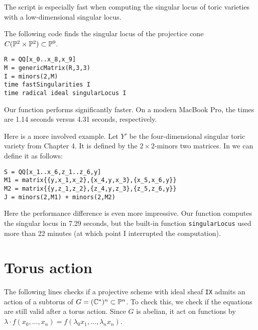 The script is especially fast when computing the singular locus of toric varieties with a low-dimensional singular locus.

The following code finds the singular locus of the projectice cone $C(\P^2 \times \P^2) \subset \P^9$.

\begin{lstlisting}[language=Macaulay2]
R = QQ[x_0..x_8,x_9]
M = genericMatrix(R,3,3)
I = minors(2,M)
time fastSingularities I
time radical ideal singularLocus I
\end{lstlisting}

Our function performs significantly faster. On a modern MacBook Pro, the times are 1.14 seconds versus 4.31 seconds, respectively.

Here is a more involved example. Let $Y'$ be the four-dimensional singular toric variety from Chapter 4. It is defined by the $2 \times 2$-minors two matrices. In \MM we can define it as follows:
\begin{lstlisting}[language=Macaulay2]
S = QQ[x_1..x_6,z_1..z_6,y]
M1 = matrix{{y,x_1,x_2},{x_4,y,x_3},{x_5,x_6,y}}
M2 = matrix{{y,z_1,z_2},{z_4,y,z_3},{z_5,z_6,y}}
J = minors(2,M1) + minors(2,M2)
\end{lstlisting}

Here the performance difference is even more impressive. Our function computes the singular locus in 7.29 seconds, but the built-in function \texttt{singularLocus} used more than 22 minutes (at which point I interrupted the computation).

\section{Torus action}

The following lines checks if a projective scheme with ideal sheaf \texttt{IX} admits an action of a subtorus of $G=(\C^\ast)^n \subset \P^n$. To check this, we check if the equations are still valid after a torus action. Since $G$ is abelian, it act on functions by $\lambda \cdot f(x_0,\ldots,x_n)=f(\lambda_0 x_1, \ldots, \lambda_n x_n)$. 



